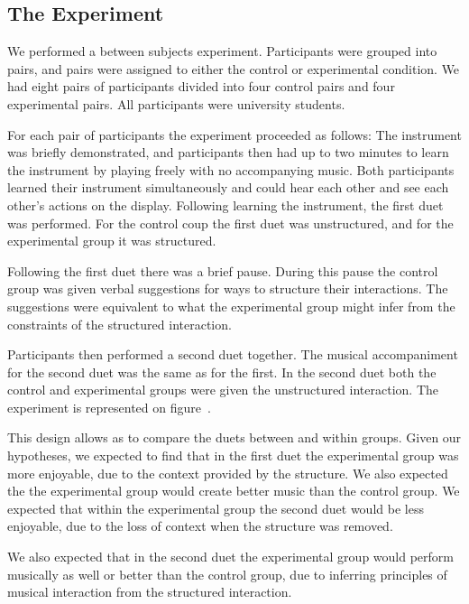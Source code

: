 \documentclass{article}
\begin{document}
\subsection{The Experiment}
We performed a between subjects experiment.  Participants were grouped into pairs, and pairs were assigned to either the control or experimental condition.  We had eight pairs of participants divided into four control pairs and four experimental pairs. All participants were university students.

For each pair of participants the experiment proceeded as follows: The instrument was briefly demonstrated, and participants then had up to two minutes to learn the instrument by playing freely with no accompanying music.  Both participants learned their instrument simultaneously and could hear each other and see each other's actions on the display.  Following learning the instrument, the first duet was performed.  For the control coup the first duet was unstructured, and for the experimental group it was structured.
 
Following the first duet there was a brief pause.  During this pause the control group was given verbal suggestions for ways to structure their interactions.  The suggestions were equivalent to what the experimental group might infer from the constraints of the structured interaction.

Participants then performed a second duet together.  The musical accompaniment for the second duet was the same as for the first.  In the second duet both the control and experimental groups were given the unstructured interaction. The experiment is represented on figure~\cite{experiment}.

This design allows as to compare the duets between and within groups.  Given our hypotheses, we expected to find that in the first duet the experimental group was more enjoyable, due to the context provided by the structure. We also expected the the experimental group would create better music than the control group. We expected that within the experimental group the second duet would be less enjoyable, due to the loss of context when the structure was removed.  

We also expected that in the second duet the experimental group would perform musically as well or better than the control group, due to inferring principles of musical interaction from the structured interaction.
\end{document}
